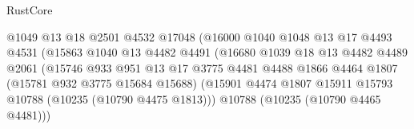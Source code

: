 \begin{lexlean}{RustCore}
\begin{coremodule}
                                            @1049
                                            @13
                                            @18
                                            @2501
                                            @4532
                                            @17048
                                            (@16000
                                              @1040
                                              @1048
                                              @13
                                              @17
                                              @4493
                                              @4531
                                              (@15863
                                                @1040
                                                @13
                                                @4482
                                                @4491
                                                (@16680
                                                  @1039
                                                  @18
                                                  @13
                                                  @4482
                                                  @4489
                                                  @2061
                                                  (@15746
                                                    @933
                                                    @951
                                                    @13
                                                    @17
                                                    @3775
                                                    @4481
                                                    @4488
                                                    @1866
                                                    @4464
                                                    @1807
                                                    (@15781 @932 @3775 @15684 @15688)
                                                    (@15901
                                                      @4474
                                                      @1807
                                                      @15911
                                                      @15793
                                                      @10788
                                                      (@10235 (@10790 @4475 @1813)))
                                                    @10788
                                                    (@10235 (@10790 @4465 @4481)))

\end{coremodule}
\end{lexlean}
